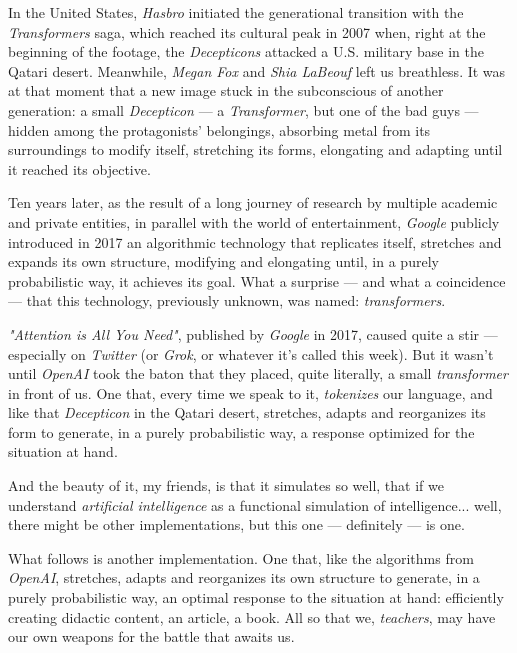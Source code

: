 \documentclass[12pt,a4paper]{article}
\begin{document}
				In the United States, \emph{Hasbro} initiated the generational transition with the \emph{Transformers} saga, which reached its cultural peak in 2007 when, right at the beginning of the footage, the \emph{Decepticons} attacked a U.S. military base in the Qatari desert. Meanwhile, \emph{Megan Fox} and \emph{Shia LaBeouf} left us breathless. It was at that moment that a new image stuck in the subconscious of another generation: a small \emph{Decepticon} — a \emph{Transformer}, but one of the bad guys — hidden among the protagonists' belongings, absorbing metal from its surroundings to modify itself, stretching its forms, elongating and adapting until it reached its objective.
				
				\medskip
				
				Ten years later, as the result of a long journey of research by multiple academic and private entities, in parallel with the world of entertainment, \emph{Google} publicly introduced in 2017 an algorithmic technology that replicates itself, stretches and expands its own structure, modifying and elongating until, in a purely probabilistic way, it achieves its goal. What a surprise — and what a coincidence — that this technology, previously unknown, was named: \emph{transformers}.
				
				\medskip
				
				\emph{"Attention is All You Need"}, published by \emph{Google} in 2017, caused quite a stir — especially on \emph{Twitter} (or \emph{Grok}, or whatever it’s called this week). But it wasn't until \emph{OpenAI} took the baton that they placed, quite literally, a small \emph{transformer} in front of us. One that, every time we speak to it, \emph{tokenizes} our language, and like that \emph{Decepticon} in the Qatari desert, stretches, adapts and reorganizes its form to generate, in a purely probabilistic way, a response optimized for the situation at hand.
				
				\medskip
				
				And the beauty of it, my friends, is that it simulates so well, that if we understand \emph{artificial intelligence} as a functional simulation of intelligence... well, there might be other implementations, but this one — definitely — is one.
				
				\medskip
				
				What follows is another implementation. One that, like the algorithms from \emph{OpenAI}, stretches, adapts and reorganizes its own structure to generate, in a purely probabilistic way, an optimal response to the situation at hand: efficiently creating didactic content, an article, a book. All so that we, \emph{teachers}, may have our own weapons for the battle that awaits us.
				
\end{document}
